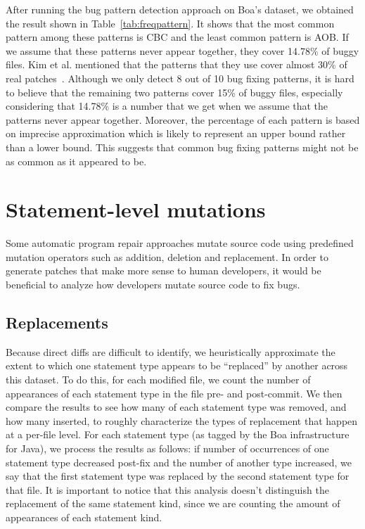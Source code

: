 \documentclass{sig-alternate-05-2015}
\begin{document}
After running the bug pattern detection approach on Boa's dataset, we obtained
the result shown in Table~\ref{tab:freqpattern}. It shows that the
most common pattern among these patterns is CBC and the least common pattern is
AOB. If we assume that these patterns never appear together,
they cover 14.78\% of buggy files. Kim et al. mentioned that the
patterns that they use cover almost 30\% of real
patches~\cite{kim2013}. Although we only detect 8 out of 10 bug fixing patterns,
it is hard to believe that the remaining two patterns cover 15\% of buggy files,
especially considering that 14.78\% is a number that we get when we assume that the patterns never appear together. Moreover, the percentage of each pattern is based
on imprecise approximation which is likely to represent an upper bound rather
than a lower bound. This suggests that common bug fixing patterns might not be
as common as it appeared to be.





\section{Statement-level mutations}
Some automatic program repair approaches mutate source code using predefined
mutation operators such as addition, deletion and replacement. In
order to generate patches that make more sense to human developers, it would be
beneficial to analyze how developers mutate source code to fix bugs. 

\subsection{Replacements}

Because direct diffs are difficult to identify, we heuristically approximate the
extent to which one statement type appears to be ``replaced'' by another across
this dataset.  To do this, for each modified file, we count the number of
appearances of each statement type in the file pre- and post-commit.  We then
compare the results to see how many of each statement type was removed, and how
many inserted, to roughly characterize the types of replacement that happen at a
per-file level.  For each statement type (as tagged by the Boa infrastructure
for Java), we process the results as follows: if number of occurrences of one
statement type decreased post-fix and the number of another type increased, we
say that the first statement type was replaced by the second statement type for
that file. It is important to notice that this analysis doesn't distinguish the
replacement of the same statement kind, since we are counting the amount of
appearances of each statement kind.
\end{document}
